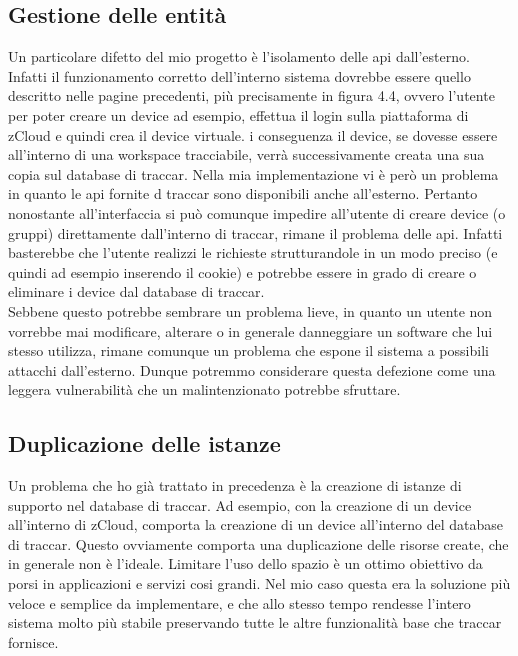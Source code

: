 \documentclass[a4paper,titlepage,12pt]{book}
\begin{document}
\subsection{\sffamily
Gestione delle entità}
Un particolare difetto del mio progetto è l'isolamento delle api dall'esterno. Infatti il funzionamento corretto dell'interno sistema dovrebbe essere quello descritto nelle pagine precedenti, più precisamente in figura 4.4, ovvero l'utente per poter creare un device ad esempio, effettua il login sulla piattaforma di zCloud e quindi crea il device virtuale. i conseguenza il device, se dovesse essere all'interno di una workspace tracciabile, verrà successivamente creata una sua copia sul database di traccar. Nella mia implementazione vi è però un problema in quanto le api fornite d traccar sono disponibili anche all'esterno. Pertanto nonostante all'interfaccia si può comunque impedire all'utente di creare device (o gruppi) direttamente dall'interno di traccar, rimane il problema delle api. Infatti basterebbe che l'utente realizzi le richieste strutturandole in un modo preciso (e quindi ad esempio inserendo il cookie) e potrebbe essere in grado di creare o eliminare i device dal database di traccar.\\
Sebbene questo potrebbe sembrare un problema lieve, in quanto un utente non vorrebbe mai modificare, alterare o in generale danneggiare un software che lui stesso utilizza, rimane comunque un problema che espone il sistema a possibili attacchi dall'esterno. Dunque potremmo considerare questa defezione come una leggera vulnerabilità che un malintenzionato potrebbe sfruttare.


\subsection{\sffamily
Duplicazione delle istanze}
Un problema che ho già trattato in precedenza è la creazione di istanze di supporto nel database di traccar. Ad esempio, con la creazione di un device all'interno di zCloud, comporta la creazione di un device all'interno del database di traccar. Questo ovviamente comporta una duplicazione delle risorse create, che in generale non è l'ideale. Limitare l'uso dello spazio è un ottimo obiettivo da porsi in applicazioni e servizi cosi grandi. Nel mio caso questa era la soluzione più veloce e semplice da implementare, e che allo stesso tempo rendesse l'intero sistema molto più stabile preservando tutte le altre funzionalità base che traccar fornisce.
\end{document}
